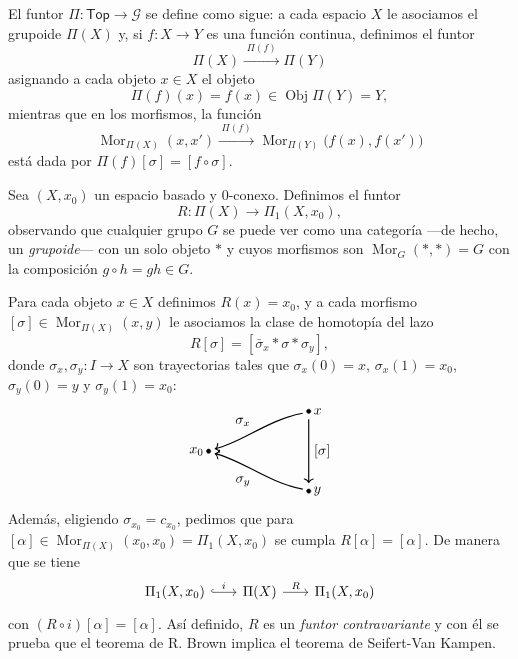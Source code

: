 \begin{definicion}
El funtor $\Pi \colon \mathsf{Top} \to \mathcal{G}$ se define como sigue: a cada espacio $X$ le asociamos el grupoide $\Pi(X)$ y, si $f \colon X \to Y$ es una función continua, definimos el funtor
\[
\Pi(X) \xrightarrow{\;\Pi(f)\;} \Pi(Y)
\]
asignando a cada objeto $x \in X$ el objeto
\[
\Pi(f)(x) = f(x) \in \operatorname{Obj}\Pi(Y) = Y,
\]
mientras que en los morfismos, la función
\[
\operatorname{Mor}_{\Pi(X)}(x, x') \xrightarrow{\;\Pi(f)\;} \operatorname{Mor}_{\Pi(Y)}\big(f(x), f(x')\big)
\]
está dada por $\Pi(f)[\sigma] = [f \circ \sigma]$.
\end{definicion}
\begin{definicion}
Sea $(X, x_0)$ un espacio basado y $0$-conexo. Definimos el funtor
\[
R \colon \Pi(X) \longrightarrow \Pi_1(X, x_0),
\]
observando que cualquier grupo $G$ se puede ver como una categoría —de hecho, un \textit{grupoide}— con un solo objeto $*$ y cuyos morfismos son $\operatorname{Mor}_G(*, *) = G$ con la composición $g \circ h = gh \in G$.

Para cada objeto $x \in X$ definimos $R(x) = x_0$, y a cada morfismo $[\sigma] \in \operatorname{Mor}_{\Pi(X)}(x, y)$ le asociamos la clase de homotopía del lazo
\[
R[\sigma] = [\bar{\sigma}_x \ast \sigma \ast \sigma_y],
\]
donde $\sigma_x, \sigma_y \colon I \to X$ son trayectorias tales que $\sigma_x(0) = x$, $\sigma_x(1) = x_0$, $\sigma_y(0) = y$ y $\sigma_y(1) = x_0$:
\[
\begin{tikzpicture}[baseline=-0.5ex]
    \filldraw (0,0) circle (1.5pt) node[left] {$x_0$};
    \filldraw (2.5,1) circle (1.5pt) node[right] {$x$};
    \filldraw (2.5,-1) circle (1.5pt) node[right] {$y$};
    \draw[->, thick] (2.35,0.95) .. controls (1.5,0.8) and (0.8,0.2) .. node[above left] {$\sigma_x$} (0.15,0.06);
    \draw[->, thick] (2.35,-0.95) .. controls (1.5,-0.8) and (0.8,-0.2) .. node[below left] {$\sigma_y$} (0.15,-0.06);
    \draw[->, thick] (2.5,0.8) -- node[right] {$[\sigma]$} (2.5,-0.8);
\end{tikzpicture}
\]
Además, eligiendo $\sigma_{x_0} = c_{x_0}$, pedimos que para $[\alpha] \in \operatorname{Mor}_{\Pi(X)}(x_0, x_0) = \Pi_1(X, x_0)$ se cumpla $R[\alpha] = [\alpha]$. De manera que se tiene
\[
\begin{tikzcd}[column sep=0.65cm]
\Pi_1(X, x_0) \arrow[r, "i", hook] & \Pi(X) \arrow[r, "R"] & \Pi_1(X, x_0)
\end{tikzcd}
\]
con $(R \circ i)[\alpha] = [\alpha]$. Así definido, $R$ es un \textit{funtor contravariante} y con él se prueba que el teorema de R. Brown implica el teorema de Seifert-Van Kampen.
\end{definicion}

